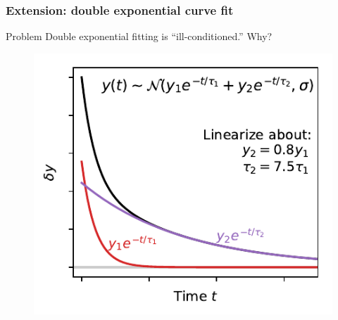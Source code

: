 \documentclass[xcolor={dvipsnames}]{beamer}
\begin{document}
\begin{frame}
\frametitle{Extension: double exponential curve fit}
\begin{block}{Problem}
Double exponential fitting is ``ill-conditioned.'' Why?
\end{block}
\begin{figure}
\includegraphics[height=0.7\textheight]{figs/two-time-constants.pdf}
\end{figure}
\end{frame}
\end{document}
